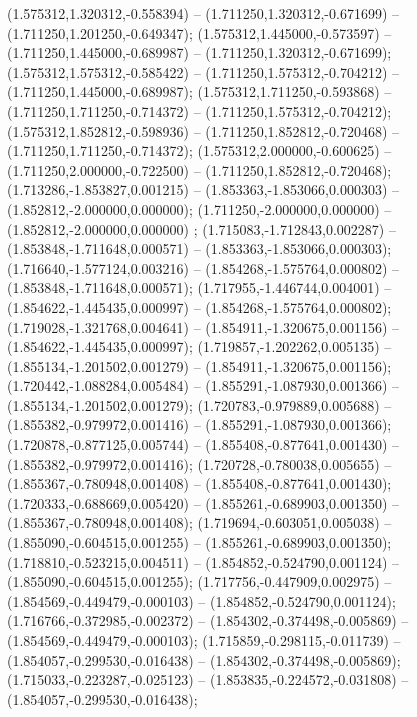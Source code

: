  (1.575312,1.320312,-0.558394) -- (1.711250,1.320312,-0.671699) -- (1.711250,1.201250,-0.649347);
 (1.575312,1.445000,-0.573597) -- (1.711250,1.445000,-0.689987) -- (1.711250,1.320312,-0.671699);
 (1.575312,1.575312,-0.585422) -- (1.711250,1.575312,-0.704212) -- (1.711250,1.445000,-0.689987);
 (1.575312,1.711250,-0.593868) -- (1.711250,1.711250,-0.714372) -- (1.711250,1.575312,-0.704212);
 (1.575312,1.852812,-0.598936) -- (1.711250,1.852812,-0.720468) -- (1.711250,1.711250,-0.714372);
 (1.575312,2.000000,-0.600625) -- (1.711250,2.000000,-0.722500) -- (1.711250,1.852812,-0.720468);
 (1.713286,-1.853827,0.001215) -- (1.853363,-1.853066,0.000303) -- (1.852812,-2.000000,0.000000);
 (1.711250,-2.000000,0.000000) -- (1.852812,-2.000000,0.000000) ;
 (1.715083,-1.712843,0.002287) -- (1.853848,-1.711648,0.000571) -- (1.853363,-1.853066,0.000303);
 (1.716640,-1.577124,0.003216) -- (1.854268,-1.575764,0.000802) -- (1.853848,-1.711648,0.000571);
 (1.717955,-1.446744,0.004001) -- (1.854622,-1.445435,0.000997) -- (1.854268,-1.575764,0.000802);
 (1.719028,-1.321768,0.004641) -- (1.854911,-1.320675,0.001156) -- (1.854622,-1.445435,0.000997);
 (1.719857,-1.202262,0.005135) -- (1.855134,-1.201502,0.001279) -- (1.854911,-1.320675,0.001156);
 (1.720442,-1.088284,0.005484) -- (1.855291,-1.087930,0.001366) -- (1.855134,-1.201502,0.001279);
 (1.720783,-0.979889,0.005688) -- (1.855382,-0.979972,0.001416) -- (1.855291,-1.087930,0.001366);
 (1.720878,-0.877125,0.005744) -- (1.855408,-0.877641,0.001430) -- (1.855382,-0.979972,0.001416);
 (1.720728,-0.780038,0.005655) -- (1.855367,-0.780948,0.001408) -- (1.855408,-0.877641,0.001430);
 (1.720333,-0.688669,0.005420) -- (1.855261,-0.689903,0.001350) -- (1.855367,-0.780948,0.001408);
 (1.719694,-0.603051,0.005038) -- (1.855090,-0.604515,0.001255) -- (1.855261,-0.689903,0.001350);
 (1.718810,-0.523215,0.004511) -- (1.854852,-0.524790,0.001124) -- (1.855090,-0.604515,0.001255);
 (1.717756,-0.447909,0.002975) -- (1.854569,-0.449479,-0.000103) -- (1.854852,-0.524790,0.001124);
 (1.716766,-0.372985,-0.002372) -- (1.854302,-0.374498,-0.005869) -- (1.854569,-0.449479,-0.000103);
 (1.715859,-0.298115,-0.011739) -- (1.854057,-0.299530,-0.016438) -- (1.854302,-0.374498,-0.005869);
 (1.715033,-0.223287,-0.025123) -- (1.853835,-0.224572,-0.031808) -- (1.854057,-0.299530,-0.016438);
